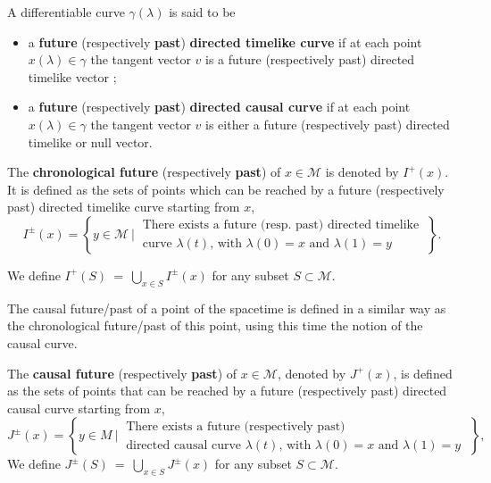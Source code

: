 \documentclass[11pt]{book}
\newcommand{\Mcal}{\mathcal{M}}
\theoremstyle{break}
\begin{document}
A differentiable curve $\gamma(\lambda)$ is said to be 
%
\begin{itemize}
\item a \textbf{future} (respectively \textbf{past}) \textbf{directed timelike curve} if at each point $x(\lambda) \in \gamma$ the tangent vector $v$ is a future (respectively past) directed timelike vector ;
\item a \textbf{future} (respectively \textbf{past}) \textbf{directed causal curve} if at each point $x(\lambda) \in \gamma$ the tangent vector $v$ is either a future (respectively past) directed timelike or null vector. 
\end{itemize}


The \textbf{chronological future} (respectively \textbf{past}) of $x \in \Mcal$ is denoted by $I^{+}(x)$. It is defined as the sets of points which can be reached by a future (respectively past) directed timelike curve starting from $x$,
%
\begin{equation*}
I^{\pm}(x) = \left\{ y \in \Mcal \ \bigg| \ \begin{array}{l} \text{There exists a future (resp. past) directed timelike} \\ \text{curve $\lambda(t)$, with $\lambda(0)=x$ and $\lambda(1)=y$} \end{array} \ \right\}.
\end{equation*}

We define $I^{+}(S) \ = \ \bigcup_{x \in S} I^{\pm}(x)$ for any subset $S \subset \Mcal$.


The causal future/past of a point of the spacetime is defined in a similar way as the chronological future/past of this point, using this time the notion of the causal curve.


The \textbf{causal future} (respectively \textbf{past}) of $x \in \Mcal$, denoted by $J^{+}(x)$, is defined as the sets of points that can be reached by a future (respectively past) directed causal curve starting from $x$,
%
\begin{equation*}
J^{\pm}(x) = \left\{ y \in M \ \bigg| \ \begin{array}{l} \text{There exists a future (respectively past)} \\ \text{directed causal curve $\lambda(t)$, with $\lambda(0)=x$ and $\lambda(1)=y$} \end{array} \; \right\},
\end{equation*}
We define $J^{\pm}(S) \ = \ \bigcup_{x \in S} J^{\pm}(x)$ for any subset $S \subset \Mcal$.
\end{document}
